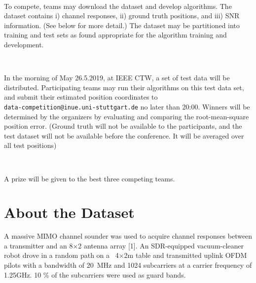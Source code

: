 \documentclass[letter]{moderncv} %
\begin{document}
~

To compete, teams may download the dataset and develop algorithms. The dataset contains i) channel responses, ii) ground truth positions, and iii) SNR information. (See below for more detail.)
The dataset may be partitioned into training and test sets as found appropriate for
the algorithm training and development.

~

In the morning of May 26.5.2019, at IEEE CTW, a set of test data will be distributed. Participating teams may run their algorithms on this test data set, and submit their
estimated position coordinates to  \\
\texttt{data-competition@inue.uni-stuttgart.de} no later than 20:00.
Winners will be determined by the organizers by evaluating and comparing the root-mean-square position error. (Ground truth will not be available to the
participants, and the test dataset will not be available before the conference. It will be averaged over all test positions)

~

A prize will be given to the best three competing teams.


\section{About the Dataset}

A massive MIMO channel sounder was used to acquire channel responses between a transmitter and an 8$\times$2 antenna array [1]. An SDR-equipped vacuum-cleaner robot drove in a random path on a ~4$\times$2m table and transmitted uplink OFDM pilots with a bandwidth of 20~MHz and 1024 subcarriers at a carrier frequency of 1.25GHz. 10 \% of the subcarriers were used as guard bands.
\vspace{2ex}
\end{document}
